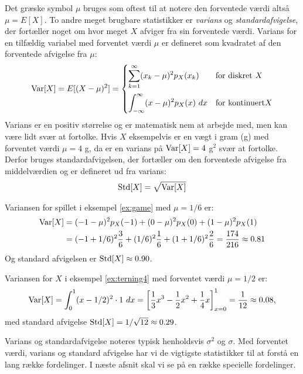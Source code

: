 Det græske symbol $\mu$ bruges som oftest til at notere den forventede værdi altså $\mu = E[X]$. To andre meget brugbare statistikker er \emph{varians} og \emph{standardafvigelse}, der fortæller noget om hvor meget $X$ afviger fra sin forventede værdi. Varians for en tilfældig variabel med forventet værdi $\mu$ er defineret som kvadratet af den forventede afvigelse fra $\mu$: 
\begin{align*}
\operatorname{Var}[X] = E[(X - \mu)^2] = \begin{cases}
\displaystyle \sum_{k = 1}^{\infty} (x_k - \mu)^2p_X(x_k) & \text{for diskret } X \\[15pt]
 \displaystyle \int_{-\infty}^{\infty} (x - \mu)^2p_X(x) \ dx & \text{for kontinuert} X 
\end{cases}
\end{align*}
Varians er en positiv størrelse og er matematisk nem at arbejde med, men kan være lidt svær at fortolke. Hvis $X$ eksempelvis er en vægt i gram (g) med forventet værdi $\mu = 4$ g, da er en varians på  $\operatorname{Var}[X] = 4$ g$^2$ svær at fortolke. Derfor bruges standardafvigelsen, der fortæller om den forventede afvigelse fra middelværdien og er defineret ud fra varians:
\begin{align*}
\operatorname*{Std}[X] = \sqrt{\operatorname{Var}[X]}
\end{align*}
\begin{example}
Variansen for spillet i eksempel \ref{ex:game} med $\mu = 1/6$ er:
\begin{align*}
\operatorname{Var}[X] &= (-1 - \mu)^2p_X(-1) + (0 - \mu)^2p_X(0) + (1 - \mu)^2p_X(1) \\
 &= (-1 + 1/6)^2\frac{3}{6} + (1/6)^2\frac{1}{6} + (1 + 1/6)^2\frac{2}{6} = \frac{174}{216} \approx 0.81
\end{align*}
Og standard afvigelsen er $\operatorname*{Std}[X] \approx 0.90$. 
\end{example}
\begin{example}
Variansen for $X$ i eksempel \ref{ex:terning4} med forventet værdi $\mu = 1/2$ er:
\begin{align*}
\operatorname{Var}[X] = \int_0^1 (x - 1/2)^2 \cdot 1 \ dx = \left[\frac{1}{3}x^3 - \frac{1}{2}x^2 + \frac{1}{4}x \right]_{x = 0}^{1} = \frac{1}{12} \approx 0.08,
\end{align*}
med standard afvigelse $\operatorname*{Std}[X] = 1/\sqrt{12} \approx 0.29$. 
\end{example}
Varians og standardafvigelse noteres typisk henholdsvis $\sigma^2$ og $\sigma$. Med forventet værdi, varians og standard afvigelse har vi de vigtigste statistikker til at forstå en lang række fordelinger. I næste afsnit skal vi se på en række specielle fordelinger. 